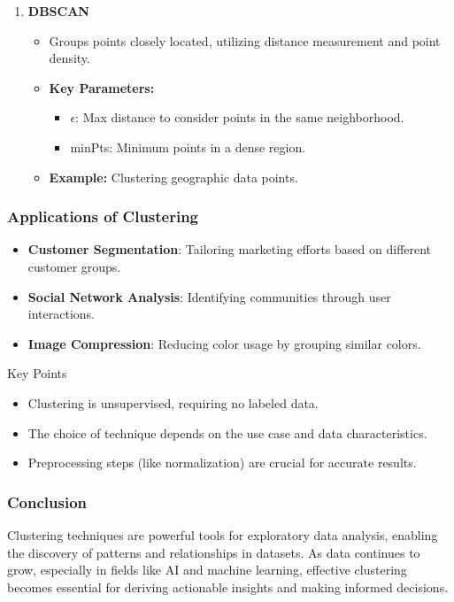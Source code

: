 \documentclass[aspectratio=169]{beamer}
\begin{document}
\begin{frame}[fragile]
\begin{enumerate}
        \item \textbf{DBSCAN}
        \begin{itemize}
            \item Groups points closely located, utilizing distance measurement and point density.
            \item \textbf{Key Parameters:}
            \begin{itemize}
                \item \( \epsilon \): Max distance to consider points in the same neighborhood.
                \item minPts: Minimum points in a dense region.
            \end{itemize}
            \item \textbf{Example:} Clustering geographic data points.
        \end{itemize}
    \end{enumerate}
\end{frame}

\begin{frame}[fragile]
    \frametitle{Applications of Clustering}
    \begin{itemize}
        \item \textbf{Customer Segmentation}: Tailoring marketing efforts based on different customer groups.
        \item \textbf{Social Network Analysis}: Identifying communities through user interactions.
        \item \textbf{Image Compression}: Reducing color usage by grouping similar colors.
    \end{itemize}

    \begin{block}{Key Points}
        \begin{itemize}
            \item Clustering is unsupervised, requiring no labeled data.
            \item The choice of technique depends on the use case and data characteristics.
            \item Preprocessing steps (like normalization) are crucial for accurate results.
        \end{itemize}
    \end{block}
\end{frame}

\begin{frame}[fragile]
    \frametitle{Conclusion}
    Clustering techniques are powerful tools for exploratory data analysis, enabling the discovery of patterns and relationships in datasets. As data continues to grow, especially in fields like AI and machine learning, effective clustering becomes essential for deriving actionable insights and making informed decisions.
\end{frame}
\end{document}
